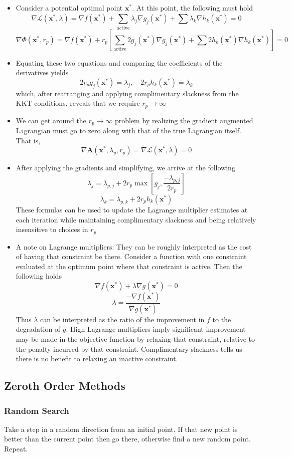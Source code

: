 \documentclass[12pt]{article}
\newcommand{\sumlim}[2]{\sum\limits_{#1}^{#2}}
\newcommand{\boldx}{\mathbf{x}}
\newcommand{\xstar}{\boldx^*}
\begin{document}
\begin{itemize}
\item Consider a potential optimal point $\xstar$. At this point, the following must hold
$$\nabla\mathcal{L}(\xstar,\lambda) = \nabla f(\xstar) + \sumlim{\textrm{active}}{}\lambda_j\nabla g_j(\xstar) + \sum\lambda_k\nabla h_k(\xstar) = 0$$
$$\nabla\Phi(\xstar,r_p) = \nabla f(\xstar) + r_p\left[\sumlim{\textrm{active}}{}2g_j(\xstar)\nabla g_j(\xstar) + \sum2h_k(\xstar)\nabla h_k(\xstar)\right] = 0$$
\item Equating these two equations and comparing the coefficients of the derivatives yields
$$2r_pg_j(\xstar)=\lambda_j,\quad 2r_ph_k(\xstar)=\lambda_k$$
which, after rearranging and applying complimentary slackness from the KKT conditions, reveals that we require $r_p\to\infty$
\item We can get around the $r_p\to\infty$ problem by realizing the gradient augmented Lagrangian must go to zero along with that of the true Lagrangian itself. That is,
$$\nabla\mathbf{A}(\xstar,\lambda_p,r_p)=\nabla\mathcal{L}(\xstar,\lambda)=0$$
\item After applying the gradients and simplifying, we arrive at the following
$$\lambda_j=\lambda_{p,j}+2r_p\max\left[g_j,\frac{-\lambda_{p,j}}{2r_p}\right]$$
$$\lambda_k=\lambda_{p,k}+2r_ph_k(\xstar)$$
These formulas can be used to update the Lagrange multiplier estimates at each iteration while maintaining complimentary slackness and being relatively insensitive to choices in $r_p$
\item A note on Lagrange multipliers: They can be roughly interpreted as the cost of having that constraint be there. Consider a function with one constraint evaluated at the optimum point where that constraint is active. Then the following holds
$$\nabla f(\xstar)+\lambda\nabla g(\xstar)=0$$
$$\lambda=\frac{-\nabla f(\xstar)}{\nabla g(\xstar)}$$
Thus $\lambda$ can be interpreted as the ratio of the improvement in $f$ to the degradation of $g$. High Lagrange multipliers imply significant improvement may be made in the objective function by relaxing that constraint, relative to the penalty incurred by that constraint. Complimentary slackness tells us there is no benefit to relaxing an inactive constraint.
\end{itemize}

\subsection{Zeroth Order Methods}
\subsubsection{Random Search}
Take a step in a random direction from an initial point. If that new point is better than the current point then go there, otherwise find a new random point. Repeat.
\end{document}
